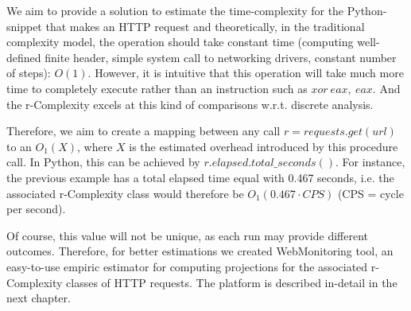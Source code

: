 We aim to provide a solution to estimate the time-complexity for the Python-snippet that makes an HTTP request and theoretically, in the traditional complexity model, the operation should take constant time (computing well-defined finite header, simple system call to networking drivers, constant number of steps): $O(1)$. However, it is intuitive that this operation will take much more time to completely execute rather than an instruction such as $xor\ eax,\ eax$. And the r-Complexity excels at this kind of comparisons w.r.t. discrete analysis.

Therefore, we aim to create a mapping between any call $r = requests.get(url)$ to an $O_{1}(X)$, where $X$ is the estimated overhead introduced by this procedure call. In Python, this can be achieved by $r.elapsed.total\_seconds()$. For instance, the previous example has a total elapsed time equal with 0.467 seconds, i.e. the associated r-Complexity class would therefore be $O_{1}(0.467 \cdot CPS)$ (CPS = cycle per second). 

Of course, this value will not be unique, as each run may provide different outcomes. Therefore, for better estimations we created WebMonitoring tool, an easy-to-use empiric estimator for computing projections for the associated r-Complexity classes of HTTP requests. The platform is described in-detail in the next chapter.


